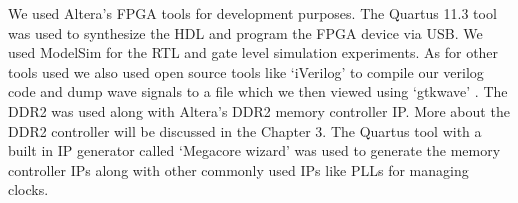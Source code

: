 We used Altera's FPGA tools for development purposes. The Quartus 11.3 tool\cite{quartus} was used to synthesize the HDL and program the FPGA device via USB. We used ModelSim for the RTL and gate level simulation experiments. As for other tools used we also used open source tools like `iVerilog'\cite{iverilog} to compile our verilog code and dump wave signals to a file which we then viewed using `gtkwave' \cite{gtkwave}. The DDR2 was used along with Altera's DDR2 memory controller IP. More about the DDR2 controller will be discussed in the Chapter 3. The Quartus tool with a built in IP generator called `Megacore wizard' was used to generate the memory controller IPs along with other commonly used IPs like PLLs for managing clocks.

